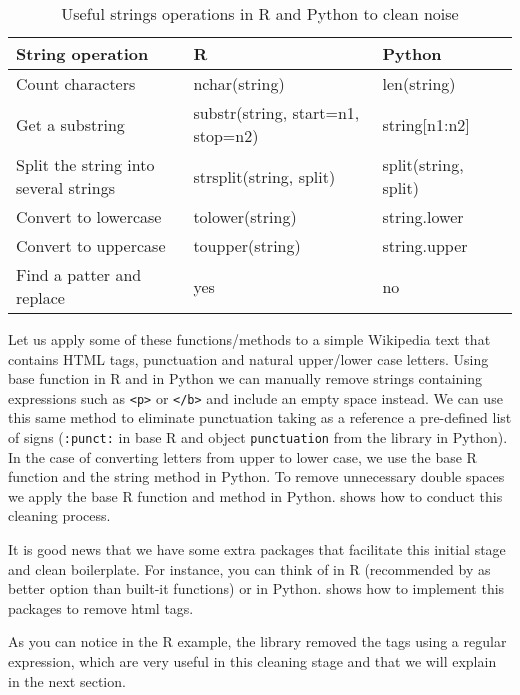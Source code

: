 \begin{table}[]
\caption{Useful strings operations in R and Python to clean noise \label{tab:string_operations}}{%
\begin{tabular}{@{}llll@{}}
\toprule
String operation      & R   & Python\\ \midrule
Count characters      & nchar(string) & len(string)  \\
Get a substring       & substr(string, start=n1, stop=n2) & string[n1:n2]            \\
Split the string into several strings   & strsplit(string, split) & split(string, split)             \\ 
Convert to lowercase  & tolower(string) & string.lower     \\ 
Convert to uppercase  & toupper(string) & string.upper     \\ 


Find a patter and replace             & yes & no \\ \bottomrule
\end{tabular}}{}
\end{table}

Let us apply some of these functions/methods to a simple Wikipedia text that contains HTML tags, punctuation and natural upper/lower case letters. Using base function  in R and  in Python we can manually remove strings containing expressions such as \texttt{<p>} or \texttt{</b>} and include an empty space instead. We can use this same method to eliminate punctuation taking as a reference a pre-defined list of signs (\texttt{:punct:} in base R and object \texttt{punctuation} from the library  in Python). In the case of converting letters from upper to lower case, we use the base R function  and the string method  in Python. To remove unnecessary double spaces we apply the base R function  and method  in Python.  shows how to conduct this cleaning process.


It is good news that we have some extra packages that facilitate this initial stage and clean boilerplate. For instance, you can think of  in R (recommended by \citet{welbers2017text} as better option than built-it functions) or  in Python.  shows how to implement this packages to remove html tags.


As you can notice in the R example, the library  removed the tags using a regular expression, which are very useful in this cleaning stage and that we will explain in the next section.	





